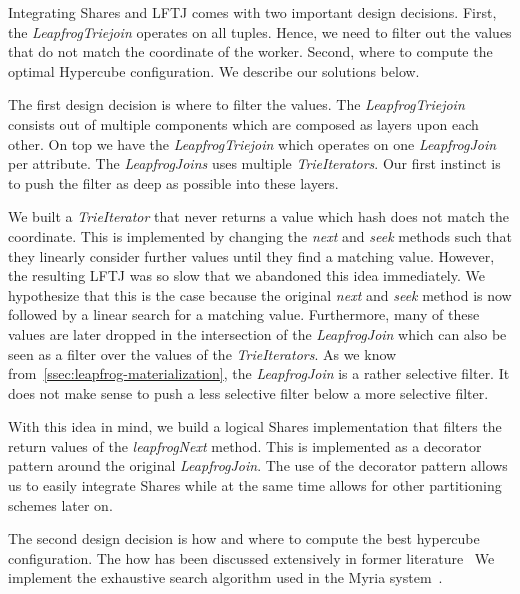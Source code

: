 Integrating Shares and \textsc{LFTJ} comes with two important design decisions.
First, the \textit{LeapfrogTriejoin} operates on all tuples.
Hence, we need to filter out the values that do not match the coordinate of the worker.
Second, where to compute the optimal Hypercube configuration.
We describe our solutions below.


The first design decision is where to filter the values.
The \textit{LeapfrogTriejoin} consists out of multiple components which are composed as layers upon each other.
On top we have the \textit{LeapfrogTriejoin} which operates on one \textit{LeapfrogJoin} per attribute.
The \textit{LeapfrogJoins} uses multiple \textit{TrieIterators}.
Our first instinct is to push the filter as deep as possible into these layers.

We built a \textit{TrieIterator} that never returns a value which hash does not match the coordinate.
This is implemented by changing the \textit{next} and \textit{seek} methods such that they linearly
consider further values until they find a matching value.
However, the resulting \textsc{LFTJ} was so slow that we abandoned this idea immediately.
We hypothesize that this is the case because the original \textit{next} and \textit{seek} method is now followed
by a linear search for a matching value.
Furthermore, many of these values are later dropped in the intersection of the \textit{LeapfrogJoin} which
can also be seen as a filter over the values of the \textit{TrieIterators}.
As we know from~\cref{ssec:leapfrog-materialization}, the \textit{LeapfrogJoin} is a rather selective filter.
It does not make sense to push a less selective filter below a more selective filter.

With this idea in mind, we build a logical Shares implementation that filters the return values of the \textit{leapfrogNext}
method.
This is implemented as a decorator pattern around the original \textit{LeapfrogJoin}.
The use of the decorator pattern allows us to easily integrate Shares while at the same time allows for
other partitioning schemes later on.

The second design decision is how and where to compute the best hypercube configuration.
The how has been discussed extensively in former literature~\cite{shares,myria-detailed}
We implement the exhaustive search algorithm used in the Myria system~\cite{myria-detailed}.

